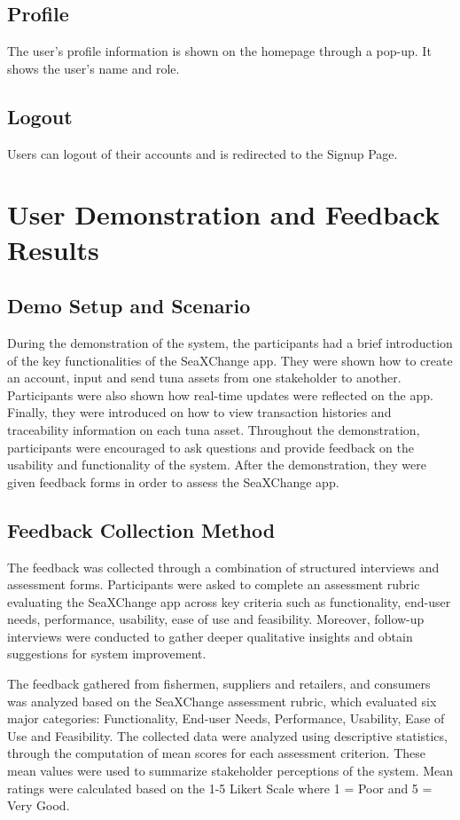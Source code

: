 \subsection{Profile}
The user's profile information is shown on the homepage through a pop-up. It shows the user's name and role.

\subsection{Logout}
Users can logout of their accounts and is redirected to the Signup Page. 

\section{User Demonstration and Feedback Results}
\subsection{Demo Setup and Scenario}
	During the demonstration of the system, the participants had a brief introduction of the key functionalities of the SeaXChange app. They were shown how to create an account, input and send tuna assets from one stakeholder to another. Participants were also shown how real-time updates were reflected on the app. Finally, they were introduced on how to view transaction histories and traceability information on each tuna asset. Throughout the demonstration, participants were encouraged to ask questions and provide feedback on the usability and functionality of the system. After the demonstration, they were given feedback forms in order to assess the SeaXChange app. 
	
\subsection{Feedback Collection Method}
	The feedback was collected through a combination of structured interviews and assessment forms. Participants were asked to complete an assessment rubric evaluating the SeaXChange app across key criteria such as functionality, end-user needs, performance, usability, ease of use and feasibility. Moreover, follow-up interviews were conducted to gather deeper qualitative insights and obtain suggestions for system improvement.
	
	The feedback gathered from fishermen, suppliers and retailers, and consumers was analyzed based on the SeaXChange assessment rubric, which evaluated six major categories: Functionality, End-user Needs, Performance, Usability, Ease of Use and Feasibility. The collected data were analyzed using descriptive statistics, through the computation of mean scores for each assessment criterion. These mean values were used to summarize stakeholder perceptions of the system. Mean ratings were calculated based on the 1-5 Likert Scale where 1 = Poor and 5 = Very Good.
	
